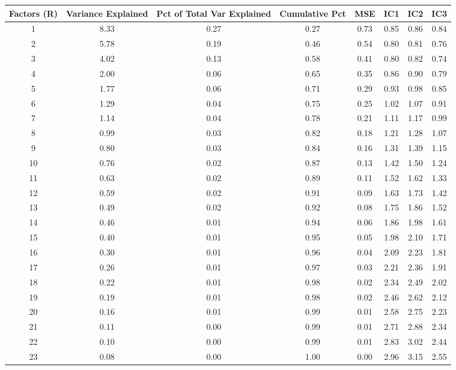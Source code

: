 \documentclass[11pt, letterpaper]{article}\usepackage[]{graphicx}\usepackage[]{color}
\begin{document}
\begin{table}[H]
\centering
\begingroup\scriptsize
\begin{tabular}{cccccccc}
  \hline
Factors (R) & Variance Explained & Pct of Total Var Explained & Cumulative Pct & MSE & IC1 & IC2 & IC3 \\ 
  \hline
  1 & 8.33 & 0.27 & 0.27 & 0.73 & 0.85 & 0.86 & 0.84 \\ 
    2 & 5.78 & 0.19 & 0.46 & 0.54 & 0.80 & 0.81 & 0.76 \\ 
    3 & 4.02 & 0.13 & 0.58 & 0.41 & 0.80 & 0.82 & 0.74 \\ 
    4 & 2.00 & 0.06 & 0.65 & 0.35 & 0.86 & 0.90 & 0.79 \\ 
    5 & 1.77 & 0.06 & 0.71 & 0.29 & 0.93 & 0.98 & 0.85 \\ 
    6 & 1.29 & 0.04 & 0.75 & 0.25 & 1.02 & 1.07 & 0.91 \\ 
    7 & 1.14 & 0.04 & 0.78 & 0.21 & 1.11 & 1.17 & 0.99 \\ 
    8 & 0.99 & 0.03 & 0.82 & 0.18 & 1.21 & 1.28 & 1.07 \\ 
    9 & 0.80 & 0.03 & 0.84 & 0.16 & 1.31 & 1.39 & 1.15 \\ 
   10 & 0.76 & 0.02 & 0.87 & 0.13 & 1.42 & 1.50 & 1.24 \\ 
   11 & 0.63 & 0.02 & 0.89 & 0.11 & 1.52 & 1.62 & 1.33 \\ 
   12 & 0.59 & 0.02 & 0.91 & 0.09 & 1.63 & 1.73 & 1.42 \\ 
   13 & 0.49 & 0.02 & 0.92 & 0.08 & 1.75 & 1.86 & 1.52 \\ 
   14 & 0.46 & 0.01 & 0.94 & 0.06 & 1.86 & 1.98 & 1.61 \\ 
   15 & 0.40 & 0.01 & 0.95 & 0.05 & 1.98 & 2.10 & 1.71 \\ 
   16 & 0.30 & 0.01 & 0.96 & 0.04 & 2.09 & 2.23 & 1.81 \\ 
   17 & 0.26 & 0.01 & 0.97 & 0.03 & 2.21 & 2.36 & 1.91 \\ 
   18 & 0.22 & 0.01 & 0.98 & 0.02 & 2.34 & 2.49 & 2.02 \\ 
   19 & 0.19 & 0.01 & 0.98 & 0.02 & 2.46 & 2.62 & 2.12 \\ 
   20 & 0.16 & 0.01 & 0.99 & 0.01 & 2.58 & 2.75 & 2.23 \\ 
   21 & 0.11 & 0.00 & 0.99 & 0.01 & 2.71 & 2.88 & 2.34 \\ 
   22 & 0.10 & 0.00 & 0.99 & 0.01 & 2.83 & 3.02 & 2.44 \\ 
   23 & 0.08 & 0.00 & 1.00 & 0.00 & 2.96 & 3.15 & 2.55 \\ 

\end{tabular}
\end{table}
\end{document}
